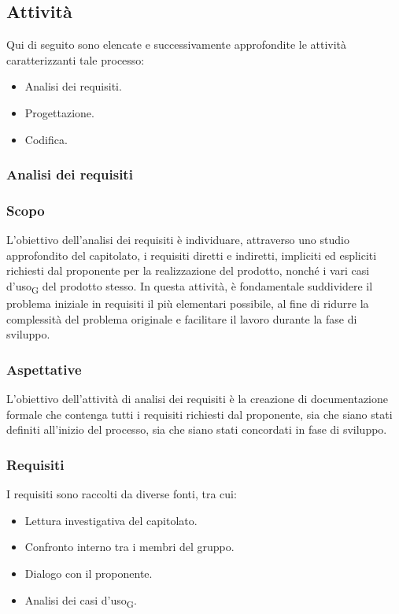 \documentclass{article}
\begin{document}
\subsection{Attività}
Qui di seguito sono elencate e successivamente approfondite le attività caratterizzanti tale processo:
\begin{itemize}
    \item Analisi dei requisiti.
    \item Progettazione.
    \item Codifica.
\end{itemize}
\subsubsection{Analisi dei requisiti}
\subsubsection*{Scopo}
L'obiettivo dell'analisi dei requisiti è individuare, attraverso uno studio approfondito del capitolato, i requisiti diretti e indiretti, impliciti ed espliciti richiesti dal proponente per la realizzazione del prodotto, nonché i vari casi d'uso\textsubscript{G} del prodotto stesso. In questa attività, è fondamentale suddividere il problema iniziale in requisiti il più elementari possibile, al fine di ridurre la complessità del problema originale e facilitare il lavoro durante la fase di sviluppo.
\subsubsection*{Aspettative}
L'obiettivo dell'attività di analisi dei requisiti è la creazione di documentazione formale che contenga tutti i requisiti richiesti dal proponente, sia che siano stati definiti all'inizio del processo, sia che siano stati concordati in fase di sviluppo.
\subsubsection*{Requisiti}
I requisiti sono raccolti da diverse fonti, tra cui:
\begin{itemize}
    \item Lettura investigativa del capitolato.
    \item Confronto interno tra i membri del gruppo.
    \item Dialogo con il proponente.
    \item Analisi dei casi d'uso\textsubscript{G}.
\end{itemize}
\end{document}
